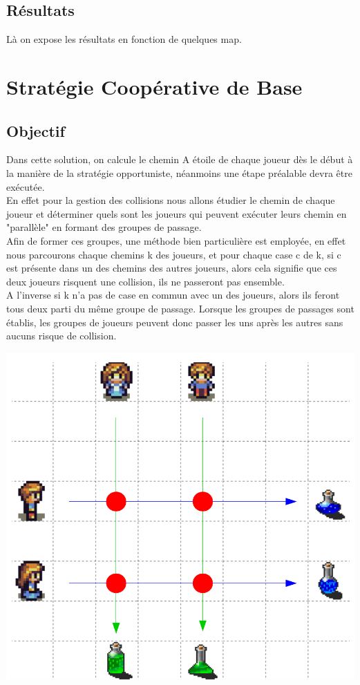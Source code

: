 \documentclass{article}
\begin{document}
	\subsection{Résultats}
	
	Là on expose les résultats en fonction de quelques map.
	
	
\section{Stratégie Coopérative de Base}
	\subsection{Objectif}
	
	Dans cette solution, on calcule le chemin A étoile de chaque joueur dès le début à la manière de la stratégie opportuniste, néanmoins une étape préalable devra être exécutée.\\
	En effet pour la gestion des collisions nous allons étudier le chemin de chaque joueur et déterminer quels sont les joueurs qui peuvent exécuter leurs chemin en "parallèle" en formant des groupes de passage.\\
	Afin de former ces groupes, une méthode bien particulière est employée, en effet nous parcourons chaque chemins k des joueurs, et pour chaque case c de k, si c est présente dans un des chemins des autres joueurs, alors cela signifie que ces deux joueurs risquent une collision, ils ne passeront pas ensemble.\\
	A l'inverse si k n'a pas de case en commun avec un des joueurs, alors ils feront tous deux parti du même groupe de passage.
	Lorsque les groupes de passages sont établis, les groupes de joueurs peuvent donc passer les uns après les autres sans aucuns risque de collision.
	
	\includegraphics[scale=0.5]{Solution2_ex.png}
	
\end{document}
